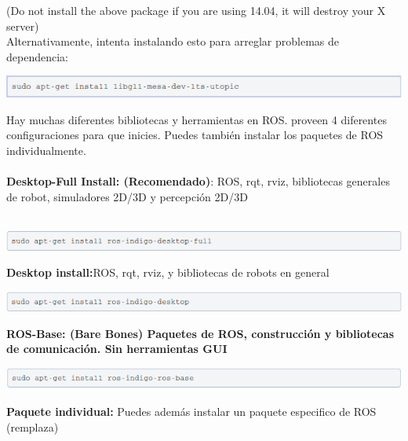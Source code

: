 \documentclass[user_manual.tex]{subfiles}
\begin{document}
(Do not install the above package if you are using 14.04, it will destroy your X server)\\
Alternativamente, intenta instalando esto para arreglar problemas de\\ dependencia: 

\begin{center}
\includegraphics[width=1\textwidth]{Figures/Software/Install_ROS/Paso_6.png}
\end{center}

Hay muchas diferentes bibliotecas y herramientas en ROS. proveen 4 diferentes configuraciones para que inicies. Puedes 
también instalar los paquetes de ROS individualmente.\\
\\
\textbf{Desktop-Full Install: (Recomendado)}: ROS, rqt, rviz, bibliotecas generales de robot, simuladores 2D/3D y 
percepción 2D/3D\\
\\

\begin{center}
\includegraphics[width=1\textwidth]{Figures/Software/Install_ROS/Paso_7.png}
\end{center}

\textbf{Desktop install:}ROS, rqt, rviz, y bibliotecas de robots en general

\begin{center}
\includegraphics[width=1\textwidth]{Figures/Software/Install_ROS/Paso_8.png}
\end{center}

\textbf{ROS-Base: (Bare Bones) Paquetes de ROS, construcción y bibliotecas de comunicación. Sin herramientas GUI}

\begin{center}
\includegraphics[width=1\textwidth]{Figures/Software/Install_ROS/Paso_9.png}
\end{center}

\textbf{Paquete individual:} Puedes además instalar un paquete especifico de ROS (remplaza)
\end{document}
